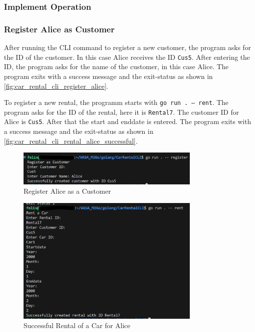 \subsubsection*{Implement Operation}

\subsubsection*{Register Alice as Customer}
After running the CLI command to register a new customer, the program asks for the ID of the customer.
In this case Alice receives the ID \texttt{Cus5}.
After entering the ID, the program asks for the name of the customer, in this case Alice.
The program exits with a success message and the exit-status as shown in \autoref{fig:car_rental_cli_register_alice}.

To register a new rental, the programm starts with \texttt{go run . -- rent}.
The program asks for the ID of the rental, here it is \texttt{Rental7}.
The customer ID for Alice is \texttt{Cus5}.
After that the start and enddate is entered.
The program exits with a success message and the exit-status as shown in \autoref{fig:car_rental_cli_rental_alice_successful}.

\begin{figure}
      \centering
      \includegraphics[width=0.8\textwidth]{figures/goLang/carRental/carRentalCLI/carRentalCLI_RegisterAlice.png}
      \caption{Register Alice as a Customer}
      \label{fig:car_rental_cli_register_alice}
\end{figure}
\begin{figure}
      \centering
      \includegraphics[width=0.8\textwidth]{figures/goLang/carRental/carRentalCLI/carRentalCLI_SuccessfulRentalAlice.png}
      \caption{Successful Rental of a Car for Alice}
      \label{fig:car_rental_cli_rental_alice_successful}
\end{figure}
